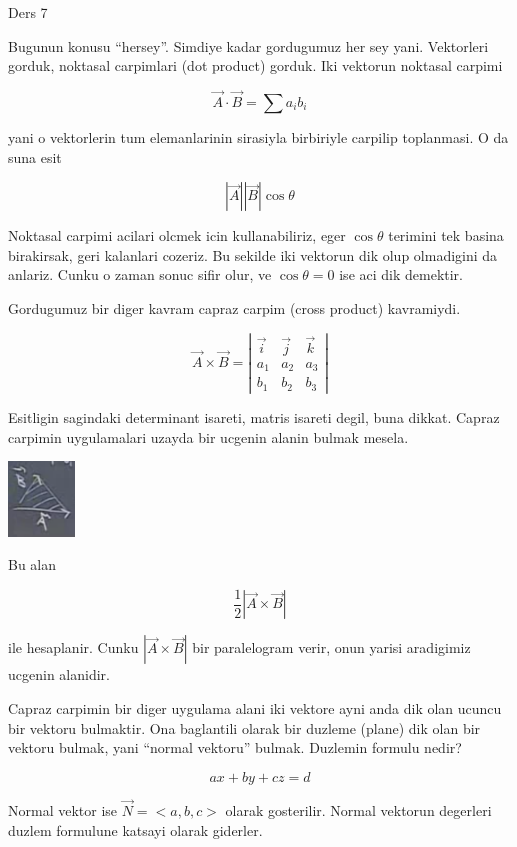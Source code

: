 \documentclass[12pt,fleqn]{article}\usepackage{../common}
\begin{document}
Ders 7

Bugunun konusu ``hersey''. Simdiye kadar gordugumuz her sey
yani. Vektorleri gorduk, noktasal carpimlari (dot product) gorduk. Iki
vektorun noktasal carpimi

\[ \vec{A} \cdot \vec{B} = \sum a_ib_i\]

yani o vektorlerin tum elemanlarinin sirasiyla birbiriyle carpilip
toplanmasi. O da suna esit

\[ |\vec{A}||\vec{B}| \cos \theta \]

Noktasal carpimi acilari olcmek icin kullanabiliriz, eger $\cos \theta$
terimini tek basina birakirsak, geri kalanlari cozeriz. Bu sekilde iki
vektorun dik olup olmadigini da anlariz. Cunku o zaman sonuc sifir olur, ve
$\cos \theta = 0$ ise aci dik demektir. 

Gordugumuz bir diger kavram capraz carpim (cross product) kavramiydi. 

\[ \vec{A} \times \vec{B} = 
\left|\begin{array}{rrr}
\vec{i} & \vec{j} & \vec{k}  \\
a_1 & a_2 & a_3 \\
b_1 & b_2 & b_3 
\end{array}\right|
\]

Esitligin sagindaki determinant isareti, matris isareti degil, buna
dikkat. Capraz carpimin uygulamalari uzayda bir ucgenin alanin bulmak
mesela. 

\includegraphics[height=2cm]{7_1.png}

Bu alan

\[ \frac{1}{2}|\vec{A} \times \vec{B}| \]

ile hesaplanir. Cunku $|\vec{A} \times \vec{B}|$ bir paralelogram verir, onun yarisi 
aradigimiz ucgenin alanidir.

Capraz carpimin bir diger uygulama alani iki vektore ayni anda dik olan
ucuncu bir vektoru bulmaktir. Ona baglantili olarak bir duzleme (plane) dik
olan bir vektoru bulmak, yani ``normal vektoru'' bulmak. Duzlemin formulu
nedir? 

\[ ax + by + cz  = d \]

Normal vektor ise $\vec{N} = <a,b,c>$ olarak gosterilir. Normal vektorun
degerleri duzlem formulune katsayi olarak giderler. 
\end{document}
